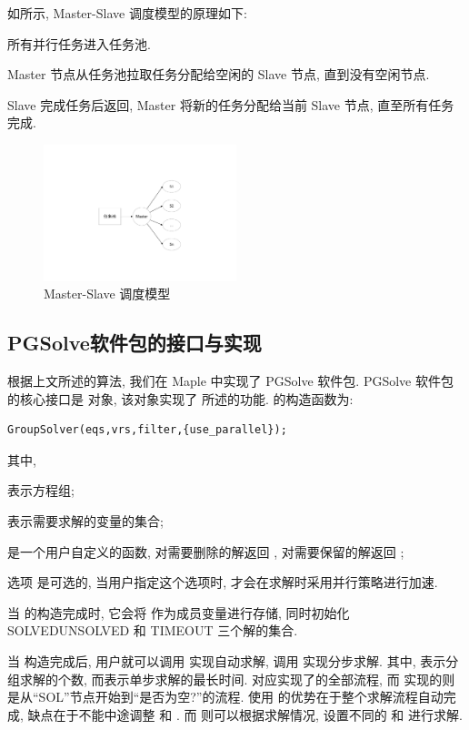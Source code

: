 如所示, Master-Slave 调度模型的原理如下:
\begin{compactenum}[Step 1.]
\item 所有并行任务进入任务池.
\item Master 节点从任务池拉取任务分配给空闲的 Slave 节点, 直到没有空闲节点.
\item Slave 完成任务后返回, Master 将新的任务分配给当前 Slave 节点, 直至所有任务完成. 
\end{compactenum}

\begin{figure}[htbp]
\centering 
\includegraphics[width=0.5\textwidth]{fig/msp.pdf}
\caption{Master-Slave 调度模型}\label{msp}
\end{figure}

\subsection{PGSolve软件包的接口与实现}
根据上文所述的算法, 我们在 Maple 中实现了 PGSolve 软件包. PGSolve 软件包的核心接口是  对象, 该对象实现了 所述的功能. 的构造函数为: 
\begin{verbatim}
GroupSolver(eqs,vrs,filter,{use_parallel});
\end{verbatim}
其中, 
\begin{compactitem}[\textbullet]
\item {} 表示方程组;
\item {} 表示需要求解的变量的集合;
\item {} 是一个用户自定义的函数, 对需要删除的解返回 , 对需要保留的解返回 ;
\item 选项  是可选的, 当用户指定这个选项时,  才会在求解时采用并行策略进行加速.
\end{compactitem}
当  的构造完成时, 它会将  作为成员变量进行存储, 同时初始化 SOLVED\D UNSOLVED 和 TIMEOUT 三个解的集合. 

当  构造完成后, 用户就可以调用  实现自动求解, 调用  实现分步求解. 其中, 表示分组求解的个数, 而表示单步求解的最长时间.   对应实现了的全部流程, 而  实现的则是从``SOL''节点开始到``是否为空?''的流程. 使用  的优势在于整个求解流程自动完成, 缺点在于不能中途调整  和 . 而  则可以根据求解情况, 设置不同的  和  进行求解. 


